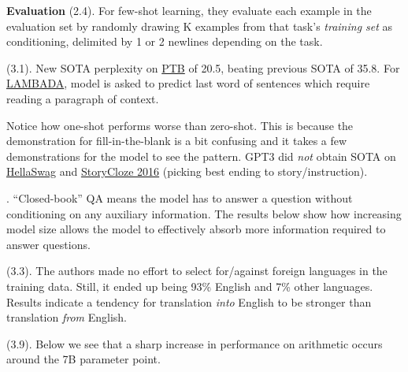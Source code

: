 \documentclass[11pt]{article}
\begin{document}
\textbf{Evaluation} (2.4). For few-shot learning, they evaluate each example in the evaluation set by randomly drawing K examples from that
task’s \textit{training set} as conditioning, delimited by 1 or 2 newlines depending on the task.

 (3.1). New SOTA perplexity on \underline{PTB} of 20.5, beating previous SOTA of 35.8. For \underline{LAMBADA}, model is asked to predict last word of sentences which require reading a paragraph of context.

Notice how one-shot performs worse than zero-shot. This is because the demonstration for fill-in-the-blank is a bit confusing and it takes a few demonstrations for the model to see the pattern. GPT3 did \textit{not} obtain SOTA on \underline{HellaSwag} and \underline{StoryCloze 2016} (picking best ending to story/instruction).

. ``Closed-book'' QA means the model has to answer a question without conditioning on any auxiliary information. The results below show how increasing model size allows the model to effectively absorb more information required to answer questions. 


 (3.3). The authors made no effort to select for/against foreign languages in the training data. Still, it ended up being 93\% English and 7\% other languages. Results indicate a tendency for translation \textit{into} English to be stronger than translation \textit{from} English.

 (3.9). Below we see that a sharp increase in performance on arithmetic occurs around the 7B parameter point.
\end{document}
